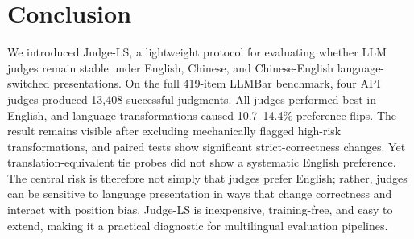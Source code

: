 \documentclass[10pt,twocolumn]{article}
\begin{document}
\section{Conclusion}

We introduced Judge-LS, a lightweight protocol for evaluating whether LLM judges remain stable under English, Chinese, and Chinese-English language-switched presentations. On the full 419-item LLMBar benchmark, four API judges produced 13,408 successful judgments. All judges performed best in English, and language transformations caused 10.7--14.4\% preference flips. The result remains visible after excluding mechanically flagged high-risk transformations, and paired tests show significant strict-correctness changes. Yet translation-equivalent tie probes did not show a systematic English preference. The central risk is therefore not simply that judges prefer English; rather, judges can be sensitive to language presentation in ways that change correctness and interact with position bias. Judge-LS is inexpensive, training-free, and easy to extend, making it a practical diagnostic for multilingual evaluation pipelines.
\end{document}
